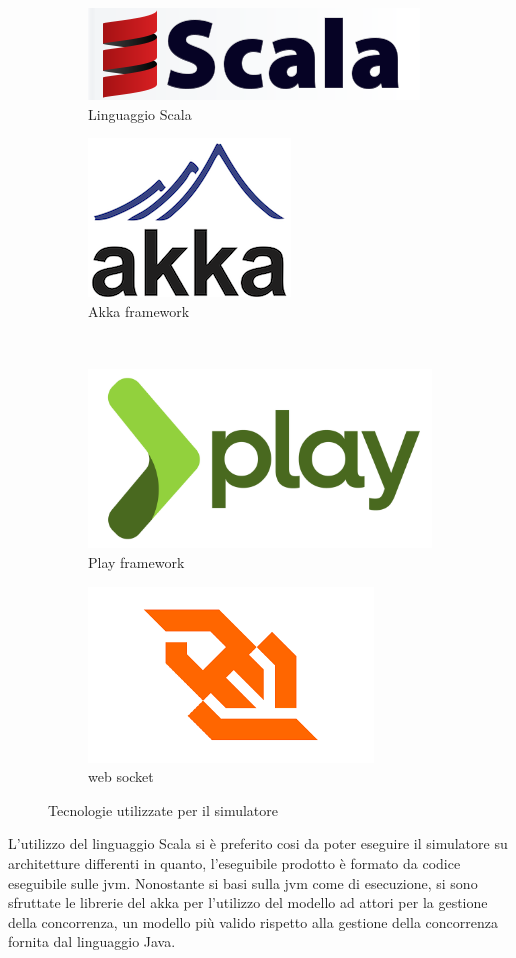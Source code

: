 \begin{figure}[h!]
\begin{subfigure}{0.5\textwidth}
\centering
\includegraphics[width=0.6\linewidth]{images/solution/scala.png}
\caption{Linguaggio Scala}
\end{subfigure}
\begin{subfigure}{0.5\textwidth}
\centering
\includegraphics[width=0.3\linewidth]{images/solution/akka.png}
\caption{Akka framework}
\end{subfigure}
\\
\begin{subfigure}{0.5\textwidth}
\centering
\includegraphics[width=0.3\linewidth]{images/solution/play.png}
\caption{Play framework}
\end{subfigure}
\begin{subfigure}{0.5\textwidth}
\centering
\includegraphics[width=0.4\linewidth]{images/solution/websocket.png}
\caption{web socket}
\end{subfigure}
\caption{Tecnologie utilizzate per il simulatore}
\label{soluzione-proposta-tecnologie-tecnologie-usate}
\end{figure}

L'utilizzo del linguaggio Scala si è preferito cosi da poter eseguire il simulatore su architetture differenti in quanto, l'eseguibile prodotto è formato da codice  eseguibile sulle \ac{jvm}. Nonostante si basi sulla \ac{jvm} come  di esecuzione, si sono sfruttate le librerie del  akka per l'utilizzo del modello ad attori per la gestione della concorrenza, un modello più valido rispetto alla gestione della concorrenza fornita dal linguaggio Java.


